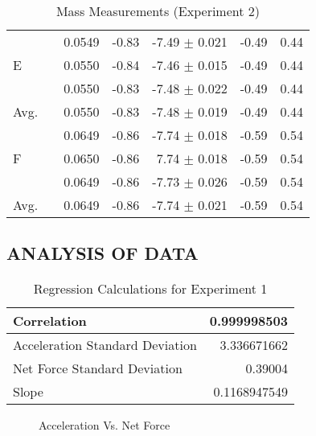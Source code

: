 \documentclass [12pt, letterpaper, twoside] {article}
\begin{document}
\begin {table}[h!]
\begin {tabular}{| l | r | r | r | r | r | r |}
    \hline
    \multirow{3}{*}{E} & & 0.0549 & -0.83 & -7.49 \(\pm\) 0.021 & -0.49 & 0.44 \\ %
    & & 0.0550 & -0.84 & -7.46 \(\pm\) 0.015 & -0.49 & 0.44 \\ %
    & & 0.0550 & -0.83 & -7.48 \(\pm\) 0.022 & -0.49 & 0.44 \\ %
    \hline
    Avg. & & 0.0550 & -0.83 & -7.48 \(\pm\) 0.019 & -0.49 & 0.44 \\ %
    \hline
    \multirow{3}{*}{F} & & 0.0649 & -0.86 & -7.74 \(\pm\) 0.018 & -0.59 & 0.54 \\ %
    & & 0.0650 & -0.86 & 7.74 \(\pm\) 0.018 & -0.59 & 0.54 \\ %
    & & 0.0649 & -0.86 & -7.73 \(\pm\) 0.026 & -0.59 & 0.54 \\ %
    \hline
    Avg. & & 0.0649 & -0.86 & -7.74 \(\pm\) 0.021 & -0.59 & 0.54 \\ %
    \hline\hline
  \end {tabular}
  \caption {Mass Measurements (Experiment 2)}
\end {table}

\subsection* {ANALYSIS OF DATA}
\begin {table}
  \centering
  \begin {tabular}{| l | r |}
    \hline\hline
    Correlation & 0.999998503 \\
    \hline
    Acceleration Standard Deviation & 3.336671662 \\
    \hline
    Net Force Standard Deviation & 0.39004 \\
    \hline
    Slope & 0.1168947549 \\
    \hline\hline
  \end {tabular}
  \caption {Regression Calculations for Experiment 1}
\end {table}

\begin {figure}[h!]
  \centering
  \caption {Acceleration Vs. Net Force}
\end {figure}
\end{document}
